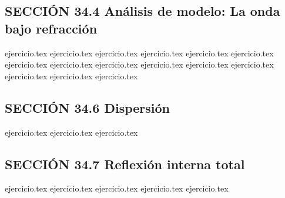\subsection*{SECCIÓN 34.4 Análisis de modelo: La onda bajo refracción}
\begin{enumerate}
    \setcounter{enumi}{8}
    {ejercicio.tex}
    {ejercicio.tex}
    {ejercicio.tex}
    {ejercicio.tex}
    {ejercicio.tex}
    {ejercicio.tex}
    {ejercicio.tex}
    {ejercicio.tex}
    {ejercicio.tex}
    {ejercicio.tex}
    {ejercicio.tex}
    {ejercicio.tex}
    {ejercicio.tex}
    {ejercicio.tex}
    {ejercicio.tex}
\end{enumerate}

\subsection*{SECCIÓN 34.6 Dispersión}
\begin{enumerate}
    \setcounter{enumi}{23}
    {ejercicio.tex}
    {ejercicio.tex}
    {ejercicio.tex}
\end{enumerate}

\subsection*{SECCIÓN 34.7 Reflexión interna total}
\begin{enumerate}
    \setcounter{enumi}{26}
    {ejercicio.tex}
    {ejercicio.tex}
    {ejercicio.tex}
    {ejercicio.tex}
    {ejercicio.tex}
\end{enumerate}


